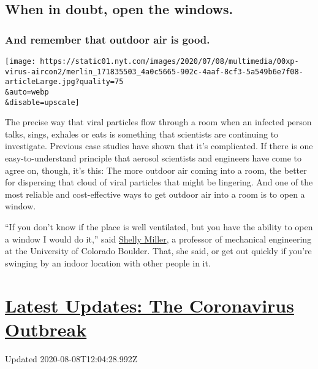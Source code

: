 \hypertarget{when-in-doubt-open-the-windows}{%
\subsection{When in doubt, open the
windows.}\label{when-in-doubt-open-the-windows}}

\hypertarget{and-remember-that-outdoor-air-is-good}{%
\subsubsection{And remember that outdoor air is
good.}\label{and-remember-that-outdoor-air-is-good}}

\texttt{[image: https://static01.nyt.com/images/2020/07/08/multimedia/00xp-virus-aircon2/merlin\_171835503\_4a0c5665-902c-4aaf-8cf3-5a549b6e7f08-articleLarge.jpg?quality=75\\\&auto=webp\\\&disable=upscale]}

The precise way that viral particles flow through a room when an
infected person talks, sings, exhales or eats is something that
scientists are continuing to investigate. Previous case studies have
shown that it's complicated. If there is one easy-to-understand
principle that aerosol scientists and engineers have come to agree on,
though, it's this: The more outdoor air coming into a room, the better
for dispersing that cloud of viral particles that might be lingering.
And one of the most reliable and cost-effective ways to get outdoor air
into a room is to open a window.

``If you don't know if the place is well ventilated, but you have the
ability to open a window I would do it,'' said
\href{https://www.colorado.edu/even/people/shelly-miller}{Shelly
Miller}, a professor of mechanical engineering at the University of
Colorado Boulder. That, she said, or get out quickly if you're swinging
by an indoor location with other people in it.

\hypertarget{latest-updates-the-coronavirus-outbreak}{%
\section{\texorpdfstring{\href{https://www.nytimes.com/2020/08/07/world/covid-19-news.html?action=click\&pgtype=Article\&state=default\&region=MAIN_CONTENT_1\&context=storylines_live_updates}{Latest
Updates: The Coronavirus
Outbreak}}{Latest Updates: The Coronavirus Outbreak}}\label{latest-updates-the-coronavirus-outbreak}}

Updated 2020-08-08T12:04:28.992Z

